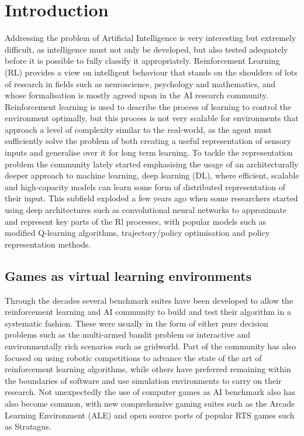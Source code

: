 \chapter{Introduction}

Addressing the problem of Artificial Intelligence is very interesting but
extremely difficult, as intelligence must not only be developed, but also tested
adequately before it is possible to fully classify it appropriately.
Reinforcement Learning (RL) provides a view on intelligent behaviour that stands
on the shoulders of lots of research in fields such as neuroscience, psychology
and mathematics, and whose formalisation is mostly agreed upon in the AI
research community\cite{Sutton:1998:IRL:551283}. Reinforcement learning is used
to describe the process of learning to control the environment optimally, but
this process is not very scalable for environments that approach a level of
complexity similar to the real-world, as the agent must sufficiently solve the
problem of both creating a useful representation of sensory inputs and
generalise over it for long term learning. To tackle the representation problem
the community lately started emphasising the usage of an architecturally deeper
approach to machine learning, deep learning (DL), where efficient, scalable and
high-capacity models can learn some form of distributed representation of their
input\cite{lecun2015deep}. This subfield exploded a few years ago when some
researchers started using deep architectures such as convolutional neural
networks to approximate and represent key parts of the Rl processes, with
popular models such as modified Q-learning algorithms\cite{mnih2013playing},
trajectory/policy optimisation\cite{levine2015end} and policy representation
methods\cite{kakade2002approximately}.

\section{Games as virtual learning environments}

Through the decades several benchmark suites have been developed to allow the
reinforcement learning and AI community to build and test their algorithm in a
systematic fashion. These were usually in the form of either pure decision
problems such as the multi-armed bandit problem\cite{berry1985bandit} or
interactive and environmentally rich scenarios such as gridworld. Part of the
community has also focused on using robotic competitions to advance the state of
the art of reinforcement learning algorithms\cite{stone2001scaling}, while
others have preferred remaining within the boundaries of software and use
simulation environments to carry on their research\cite{gosavi2014simulation}.
Not unexpectedly the use of computer games as AI benchmark also has also become
common, with new comprehensive gaming suites such as the Arcade Learning
Environment (ALE)\cite{bellemare2012arcade} and open source ports of popular
RTS games such as Stratagus\cite{ponsen2005stratagus}.

